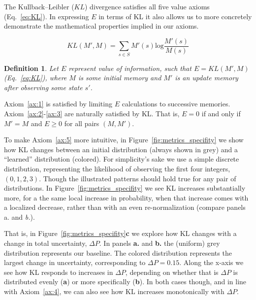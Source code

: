 \documentclass[9pt,twocolumn,twoside]{pnas-new}
\newtheorem{definition}{Definition}
\begin{document}
The Kullback--Leibler ($KL$) divergence satisfies all five value axioms (Eq.~\ref{eq:KL}). In expressing $E$ in terms of KL it also allows us to more concretely demonstrate the mathematical properties implied in our axioms.
 
\begin{equation}
    KL(M', M) = \sum_{s \in S} M'(s) \text{log} \frac{M'(s)}{M(s)} 
    \label{eq:KL}
\end{equation}

\begin{definition}
    Let $E$ represent value of information, such that $E = KL(M', M)$ (Eq.~\ref{eq:KL}), where $M$ is some initial memory and $M'$ is an update memory after observing some state $s'$.
\end{definition}

Axiom~\ref{ax:1} is satisfied by limiting $E$ calculations to successive memories. Axiom~\ref{ax:2}-\ref{ax:3} are naturally satisfied by KL. That is, $E = 0$ if and only if $M' = M$ and $E \geq 0$ for all pairs $(M, M')$.

To make Axiom~\ref{ax:5} more intuitive, in Figure~\ref{fig:metrics_specifity} we show how KL changes between an initial distribution (always shown in grey) and a ``learned'' distribution (colored). For simplicity's sake we use a simple discrete distribution, representing the likelihood of observing the first four integers, $(0,1,2,3)$. Though the illustrated patterns should hold true for any pair of distributions. In Figure~\ref{fig:metrics_specifity} we see KL increases substantially more, for a the same local increase in probability, when that increase comes with a localized decrease, rather than with an even re-normalization (compare panels \textit{}{a.} and \textit{b.}). 

That is, in Figure~\ref{fig:metrics_specifity}\textbf{c} we explore how KL changes with a change in total uncertainty, $\Delta P$. In panels \textbf{a.} and \textbf{b.} the (uniform) grey distribution represents our baseline. The colored distribution represents the largest change in uncertainty, corresponding to $\Delta P = 0.15$. Along the x-axis we see how KL responds to increases in $\Delta P$, depending on whether that is $\Delta P$ is distributed evenly (\textbf{a}) or more specifically (\textbf{b}). In both cases though, and in line with Axiom~\ref{ax:4}, we can also see how KL increases monotonically with $\Delta P$.
\end{document}
